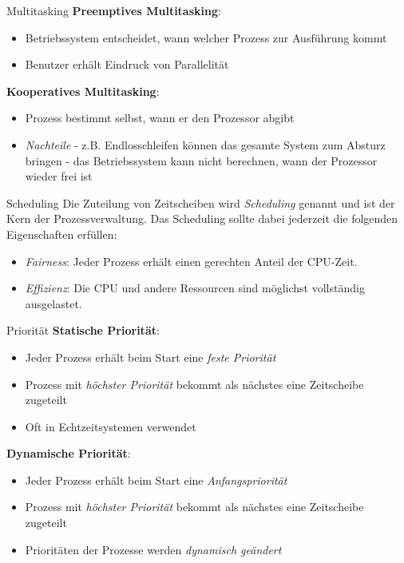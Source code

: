\begin{bonus}{Multitasking}
    \textbf{Preemptives Multitasking}:
    \begin{itemize}
        \item Betriebssystem entscheidet, wann welcher Prozess zur Ausführung kommt
        \item Benutzer erhält Eindruck von Parallelität
    \end{itemize}

    \textbf{Kooperatives Multitasking}:
    \begin{itemize}
        \item Prozess bestimmt selbst, wann er den Prozessor abgibt
        \item \emph{Nachteile}
              \subitem - z.B. Endlosschleifen können das gesamte System zum Absturz bringen
              \subitem - das Betriebssystem kann nicht berechnen, wann der Prozessor wieder frei ist
    \end{itemize}
\end{bonus}

\begin{defi}{Scheduling}
    Die Zuteilung von Zeitscheiben wird \emph{Scheduling} genannt und ist der Kern der Prozessverwaltung.
    Das Scheduling sollte dabei jederzeit die folgenden Eigenschaften erfüllen:
    \begin{itemize}
        \item \emph{Fairness}: Jeder Prozess erhält einen gerechten Anteil der CPU-Zeit.
        \item \emph{Effizienz}: Die CPU und andere Ressourcen sind möglichst vollständig ausgelastet.
    \end{itemize}
\end{defi}

\begin{bonus}{Priorität}
    \textbf{Statische Priorität}:
    \begin{itemize}
        \item Jeder Prozess erhält beim Start eine \emph{feste Priorität}
        \item Prozess mit \emph{höchster Priorität} bekommt als nächstes eine Zeitscheibe zugeteilt
        \item Oft in Echtzeitsystemen verwendet
    \end{itemize}

    \textbf{Dynamische Priorität}:
    \begin{itemize}
        \item Jeder Prozess erhält beim Start eine \emph{Anfangspriorität}
        \item Prozess mit \emph{höchster Priorität} bekommt als nächstes eine Zeitscheibe zugeteilt
        \item Prioritäten der Prozesse werden \emph{dynamisch geändert}
    \end{itemize}
\end{bonus}

